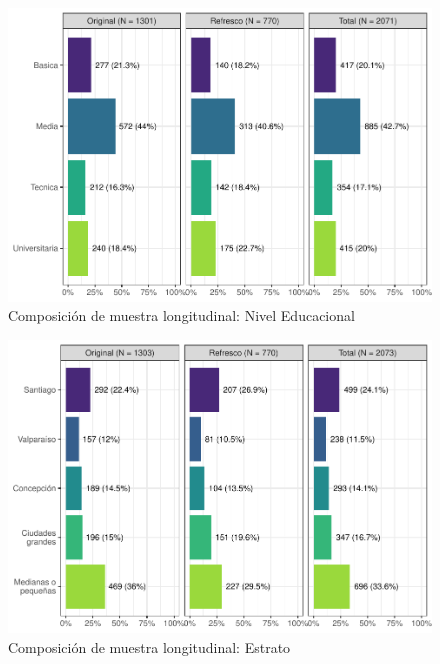\documentclass[
  12pt,
]{book}
\begin{document}
\begin{figure}

{\centering \includegraphics{reporte-elsoc_files/figure-latex/graf-educ-muestra-1} 

}

\caption{Composición de muestra longitudinal: Nivel Educacional}\label{fig:graf-educ-muestra}
\end{figure}

\begin{figure}

{\centering \includegraphics{reporte-elsoc_files/figure-latex/graf-estrato-muestra-1} 

}

\caption{Composición de muestra longitudinal: Estrato}\label{fig:graf-estrato-muestra}
\end{figure}
\end{document}
